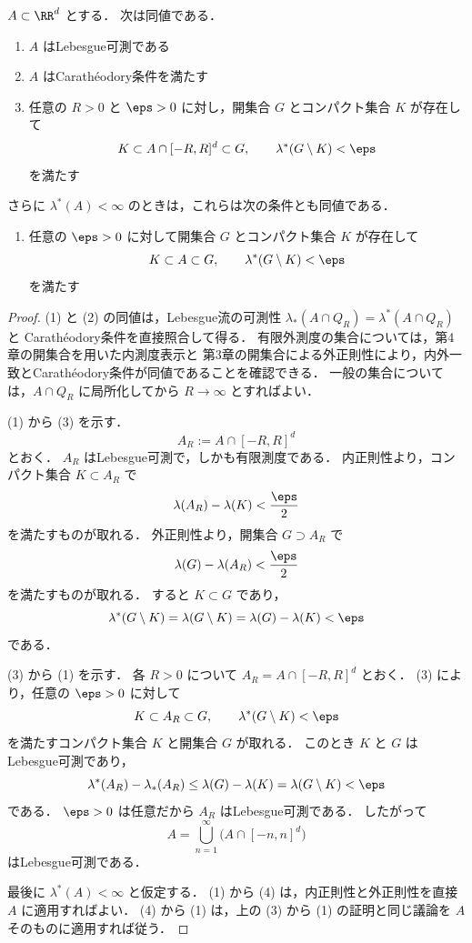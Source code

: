 \begin{theorem}[判定法] \label{thm:lebesgue-measurable-equivalent}
$A\subset\RR^d$ とする．
次は同値である．
\begin{enumerate}
    \item $A$ はLebesgue可測である
    \item $A$ はCarathéodory条件を満たす
    \item 任意の $R>0$ と $\eps>0$ に対し，開集合 $G$ とコンパクト集合 $K$ が存在して
    \[
    K\subset A\cap[-R,R]^d\subset G,
    \qquad
    \lambda^*(G\setminus K)<\eps
    \]
    を満たす
\end{enumerate}
さらに $\lambda^*(A)<\infty$ のときは，これらは次の条件とも同値である．
\begin{enumerate}
    \item[(4)] 任意の $\eps>0$ に対して開集合 $G$ とコンパクト集合 $K$ が存在して
    \[
    K\subset A\subset G,
    \qquad
    \lambda^*(G\setminus K)<\eps
    \]
    を満たす
\end{enumerate}
\end{theorem}
\begin{proof}
(1) と (2) の同値は，Lebesgue流の可測性
$\lambda_*(A\cap Q_R)=\lambda^*(A\cap Q_R)$ と
Carathéodory条件を直接照合して得る．
有限外測度の集合については，第4章の開集合を用いた内測度表示と
第3章の開集合による外正則性により，内外一致とCarathéodory条件が同値であることを確認できる．
一般の集合については，$A\cap Q_R$ に局所化してから
$R\to\infty$ とすればよい．

(1) から (3) を示す．
\[
A_R:=A\cap[-R,R]^d
\]
とおく．
$A_R$ はLebesgue可測で，しかも有限測度である．
内正則性より，コンパクト集合 $K\subset A_R$ で
\[
\lambda(A_R)-\lambda(K)<\frac{\eps}{2}
\]
を満たすものが取れる．
外正則性より，開集合 $G\supset A_R$ で
\[
\lambda(G)-\lambda(A_R)<\frac{\eps}{2}
\]
を満たすものが取れる．
すると $K\subset G$ であり，
\[
\lambda^*(G\setminus K)
=
\lambda(G\setminus K)
=
\lambda(G)-\lambda(K)
<\eps
\]
である．

(3) から (1) を示す．
各 $R>0$ について $A_R=A\cap[-R,R]^d$ とおく．
(3) により，任意の $\eps>0$ に対して
\[
K\subset A_R\subset G,
\qquad
\lambda^*(G\setminus K)<\eps
\]
を満たすコンパクト集合 $K$ と開集合 $G$ が取れる．
このとき $K$ と $G$ はLebesgue可測であり，
\[
\lambda^*(A_R)-\lambda_*(A_R)
\le
\lambda(G)-\lambda(K)
=
\lambda(G\setminus K)
<\eps
\]
である．
$\eps>0$ は任意だから $A_R$ はLebesgue可測である．
したがって
\[
A=\bigcup_{n=1}^{\infty}\bigl(A\cap[-n,n]^d\bigr)
\]
はLebesgue可測である．

最後に $\lambda^*(A)<\infty$ と仮定する．
(1) から (4) は，内正則性と外正則性を直接 $A$ に適用すればよい．
(4) から (1) は，上の (3) から (1) の証明と同じ議論を $A$ そのものに適用すれば従う．
\end{proof}


